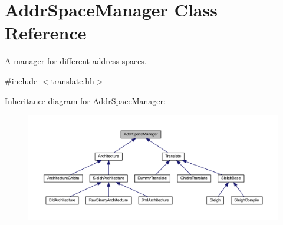 \hypertarget{class_addr_space_manager}{}\section{Addr\+Space\+Manager Class Reference}
\label{class_addr_space_manager}


A manager for different address spaces.  




{\ttfamily \#include $<$translate.\+hh$>$}



Inheritance diagram for Addr\+Space\+Manager\+:
\nopagebreak
\begin{figure}[H]
\begin{center}
\leavevmode
\includegraphics[width=350pt]{class_addr_space_manager__inherit__graph}
\end{center}
\end{figure}
